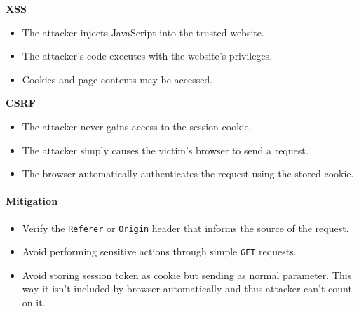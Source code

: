 \textbf{XSS}

\begin{itemize}
    \item The attacker injects JavaScript into the trusted website.
    \item The attacker's code executes with the website's privileges.
    \item Cookies and page contents may be accessed.
\end{itemize}

\vspace{0.3em}

\textbf{CSRF}

\begin{itemize}
    \item The attacker never gains access to the session cookie.
    \item The attacker simply causes the victim's browser to send a request.
    \item The browser automatically authenticates the request using the stored cookie.
\end{itemize}

\paragraph{Mitigation}

\begin{itemize}
    \item Verify the \texttt{Referer} or \texttt{Origin} header that informs the source of the request.
    \item Avoid performing sensitive actions through simple \texttt{GET} requests.
    \item Avoid storing session token as cookie but sending as normal parameter. This way it isn't included by browser automatically and thus attacker can't count on it.
\end{itemize}

